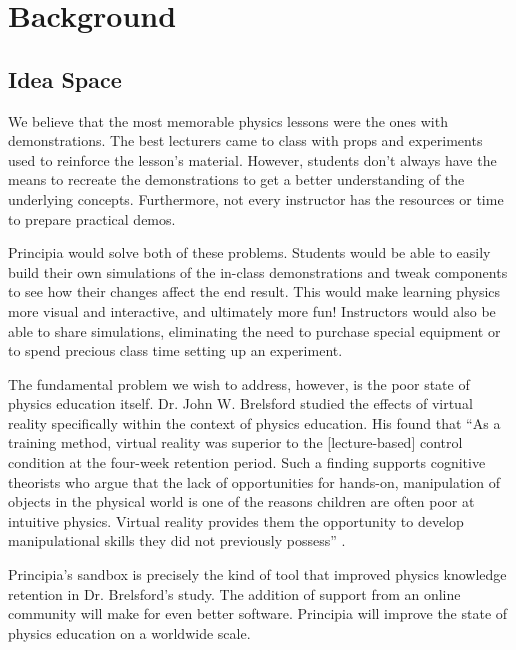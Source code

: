 \section{Background}

\subsection{Idea Space}

\BgThispage
We believe that the most memorable physics lessons were the ones with demonstrations. The best lecturers came to class with props and experiments used to reinforce the lesson's material. However, students don't always have the means to recreate the demonstrations to get a better understanding of the underlying concepts. Furthermore, not every instructor has the resources or time to prepare practical demos.

Principia would solve both of these problems. Students would be able to easily build their own simulations of the in-class demonstrations and tweak components to see how their changes affect the end result. This would make learning physics more visual and interactive, and ultimately more fun! Instructors would also be able to share simulations, eliminating the need to purchase special equipment or to spend precious class time setting up an experiment. 

The fundamental problem we wish to address, however, is the poor state of physics education itself. Dr. John W. Brelsford studied the effects of virtual reality specifically within the context of physics education. His found that ``As a training method, virtual reality was superior to the [lecture-based] control condition at the four-week retention period. Such a finding supports cognitive theorists who argue that the lack of opportunities for hands-on, manipulation of objects in the physical world is one of the reasons children are often poor at intuitive physics. Virtual reality provides them the opportunity to develop manipulational skills they did not previously possess'' \cite{Brelsford}.

Principia's sandbox is precisely the kind of tool that improved physics knowledge retention in Dr. Brelsford's study. The addition of support from an online community will make for even better software. Principia will improve the state of physics education on a worldwide scale.

